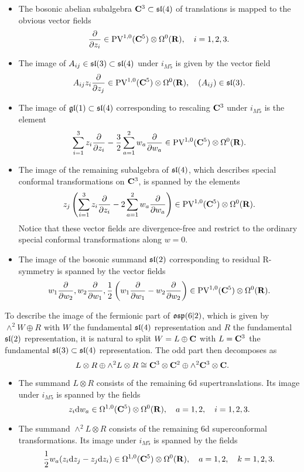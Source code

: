 \documentclass[../main.tex]{subfiles}
\begin{document}
\begin{itemize}
\item
The bosonic abelian subalgebra $\mathbf{C}^3 \subset \mathfrak{sl}(4)$ of translations is mapped to the obvious vector fields 
\[
\frac{\partial}{\partial z_i} \in \text{PV}^{1,0}(\mathbf{C}^5) \otimes \Omega^0(\mathbf{R}) , \quad i=1,2,3.
\]

\item
The image of $A_{ij}\in \mathfrak{sl}(3) \subset \mathfrak{sl}(4)$ under $i_{M5}$ is given by the vector field
\[
A_{ij} z_i \frac{\partial}{\partial z_j} \in \text{PV}^{1,0}(\mathbf{C}^5)\otimes \Omega^0(\mathbf{R}) , \quad (A_{ij}) \in \mathfrak{sl}(3) .
\]

\item
The image of  $\mathfrak{gl}(1) \subset \mathfrak{sl}(4)$ corresponding to rescaling $\mathbf{C}^3$ under $i_{M5}$ is the element
\[
\sum_{i=1}^3 z_i \frac{\partial}{\partial z_i} - \frac32 \sum_{a=1}^2 w_a \frac{\partial}{\partial w_a} \in \text{PV}^{1,0}(\mathbf{C}^5) \otimes \Omega^0(\mathbf{R})  .
\] 

\item 
The image of the remaining subalgebra of $\mathfrak{sl}(4)$, which describes special conformal transformations on $\mathbf{C}^3$, is spanned by the elements
\[
z_j \left(\sum_{i=1}^3 z_i \frac{\partial}{\partial z_i} - 2 \sum_{a=1}^2 w_a \frac{\partial}{\partial w_a} \right) \in \text{PV}^{1,0}(\mathbf{C}^5) \otimes \Omega^0(\mathbf{R}) .
\] 
Notice that these vector fields are divergence-free and restrict to the ordinary special conformal transformations along $w=0$. 
\item 
The image of the bosonic summand $\mathfrak{sl}(2)$ corresponding to residual R-symmetry is spanned by the vector fields
\[
w_1 \frac{\partial}{\partial w_2}, w_2 \frac{\partial}{\partial w_1}, \frac12 \left(w_1 \frac{\partial}{\partial w_1} - w_2 \frac{\partial}{\partial w_2}\right) \in \text{PV}^{1,0}(\mathbf{C}^5) \otimes \Omega^0(\mathbf{R}) .
\]
\end{itemize}

To describe the image of the fermionic part of $\mathfrak{osp}(6|2)$, which is given by $\wedge^2 W \oplus R$ with $W$ the fundamental $\mathfrak{sl}(4)$ representation and $R$ the fundamental $\mathfrak{sl}(2)$ representation, it is natural to split $W = L \oplus \mathbf{C}$ with $L = \mathbf{C}^3$ the fundamental $\mathfrak{sl}(3) \subset \mathfrak{sl}(4)$ representation. 
The odd part then decomposes as
\[
L \otimes R \oplus \wedge^2 L \otimes R \cong \mathbf{C}^3 \otimes \mathbf{C}^2 \oplus \wedge^2 \mathbf{C}^3 \otimes \mathbf{C} .
\]

\begin{itemize} 
\item The summand $L \otimes R$ consists of the remaining 6d supertranslations. Its image under $i_{M5}$ is spanned by the fields
\[
z_i \mathrm{d} w_a \in \Omega^{1,0}(\mathbf{C}^5) \otimes \Omega^0(\mathbf{R}) ,\quad a=1,2, \quad i =1,2,3.
\] 

\item The summand $\wedge^2 L \otimes R$ consists of the remaining 6d superconformal transformations. Its image under $i_{M5}$ is spanned by the fields
\[
\frac12 w_a (z_i \mathrm{d} z_j - z_j \mathrm{d} z_i) \in \Omega^{1,0}(\mathbf{C}^5)\otimes \Omega^0(\mathbf{R}) , \quad a = 1,2, \quad k = 1,2,3. 
\]
\end{itemize}
\end{document}
